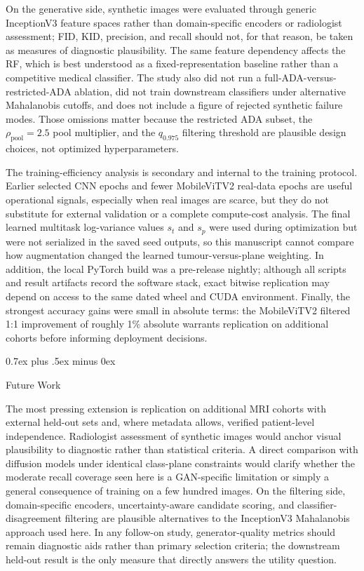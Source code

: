 \documentclass[conference,twoside]{IEEEtran}
\makeatletter
\newcommand{\bodyfont}{\rmfamily}
\def\subsection{\@startsection{subsection}{2}{\z@}{1.5ex plus 1.5ex minus 0.5ex}%
{0.7ex plus .5ex minus 0ex}{\normalfont\normalsize\bodyfont\bfseries\raggedright}}
\makeatother
\begin{document}
On the generative side, synthetic images were evaluated through generic InceptionV3 feature spaces rather than domain-specific encoders or radiologist assessment; FID, KID, precision, and recall should not, for that reason, be taken as measures of diagnostic plausibility. The same feature dependency affects the RF, which is best understood as a fixed-representation baseline rather than a competitive medical classifier. The study also did not run a full-ADA-versus-restricted-ADA ablation, did not train downstream classifiers under alternative Mahalanobis cutoffs, and does not include a figure of rejected synthetic failure modes. Those omissions matter because the restricted ADA subset, the $\rho_{\mathrm{pool}}=2.5$ pool multiplier, and the $q_{0.975}$ filtering threshold are plausible design choices, not optimized hyperparameters.

The training-efficiency analysis is secondary and internal to the training protocol. Earlier selected CNN epochs and fewer MobileViTV2 real-data epochs are useful operational signals, especially when real images are scarce, but they do not substitute for external validation or a complete compute-cost analysis. The final learned multitask log-variance values $s_t$ and $s_p$ were used during optimization but were not serialized in the saved seed outputs, so this manuscript cannot compare how augmentation changed the learned tumour-versus-plane weighting. In addition, the local PyTorch build was a pre-release nightly; although all scripts and result artifacts record the software stack, exact bitwise replication may depend on access to the same dated wheel and CUDA environment. Finally, the strongest accuracy gains were small in absolute terms: the MobileViTV2 filtered 1:1 improvement of roughly 1\% absolute warrants replication on additional cohorts before informing deployment decisions.

\subsection{Future Work}

The most pressing extension is replication on additional MRI cohorts with external held-out sets and, where metadata allows, verified patient-level independence. Radiologist assessment of synthetic images would anchor visual plausibility to diagnostic rather than statistical criteria. A direct comparison with diffusion models under identical class-plane constraints would clarify whether the moderate recall coverage seen here is a GAN-specific limitation or simply a general consequence of training on a few hundred images. On the filtering side, domain-specific encoders, uncertainty-aware candidate scoring, and classifier-disagreement filtering are plausible alternatives to the InceptionV3 Mahalanobis approach used here. In any follow-on study, generator-quality metrics should remain diagnostic aids rather than primary selection criteria; the downstream held-out result is the only measure that directly answers the utility question.
\end{document}
